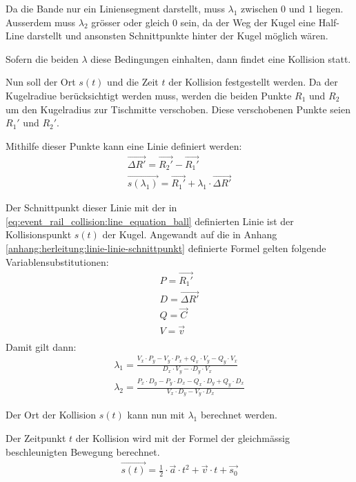 Da die Bande nur ein Liniensegment darstellt, muss $\lambda_1$ zwischen $0$ und $1$ liegen.
Ausserdem muss $\lambda_2$ grösser oder gleich $0$ sein, da der Weg der Kugel eine Half-Line darstellt und ansonsten
Schnittpunkte hinter der Kugel möglich wären.

Sofern die beiden $\lambda$ diese Bedingungen einhalten, dann findet eine Kollision statt.

Nun soll der Ort $s(t)$ und die Zeit $t$ der Kollision
festgestellt werden. Da der Kugelradiue berücksichtigt werden muss,
werden die beiden Punkte $R_1$ und $R_2$ um den Kugelradius zur Tischmitte verschoben.
Diese verschobenen Punkte seien $R_1'$ und $R_2'$.

Mithilfe dieser Punkte kann eine Linie definiert werden:
\begin{align}
    \vec{\Delta R'} = \vec{R_2'} - \vec{R_1'}\\
    \vec{s(\lambda_1)} = \vec{R_1'} + \lambda_1 \cdot \vec{\Delta R'}
\end{align}

Der Schnittpunkt dieser Linie mit der in \ref{eq:event_rail_collision:line_equation_ball} definierten Linie ist
der Kollisionspunkt $s(t)$ der Kugel.
Angewandt auf die in Anhang \ref{anhang:herleitung:linie-linie-schnittpunkt} definierte Formel gelten folgende
Variablensubstitutionen:
\begin{align}
    P = \vec{R_1'}\\
    D = \vec{\Delta R'}\\
    Q = \vec{C}\\
    V = \vec{v}\\
\end{align}
Damit gilt dann:
\begin{align}
    \lambda_1 = \frac{V_x \cdot P_y - V_y \cdot P_x + Q_x \cdot V_y - Q_y \cdot V_x}{D_x \cdot V_y - \cdot D_y \cdot V_x}\\
    \lambda_2 = \frac{P_x \cdot D_y - P_y \cdot D_x - Q_x \cdot D_y + Q_y \cdot D_x}{V_x \cdot D_y - V_y \cdot D_x}
\end{align}

Der Ort der Kollision $s(t)$ kann nun mit $\lambda_1$ berechnet werden.

Der Zeitpunkt $t$ der Kollision wird mit der Formel der gleichmässig beschleunigten Bewegung berechnet.
\begin{align}
    \vec{s(t)} = \frac{1}{2} \cdot \vec{a} \cdot t^2 + \vec{v} \cdot t + \vec{s_0}
\end{align}

